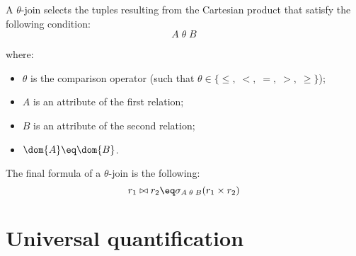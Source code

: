 A $\theta$-join selects the tuples resulting from the Cartesian product that satisfy the following condition:
\[ A \; \theta \; B\]

where:
\begin{itemize}
    \item $\theta$ is the comparison operator (such that $\theta \in \{ \leq, \; <, \; =, \; >, \; \geq \}$);
    \item $A$ is an attribute of the first relation;
    \item $B$ is an attribute of the second relation;
    \item $\dom{A} \eq \dom{B}$.
\end{itemize}

The final formula of a $\theta$-join is the following:
\[ r_1 \bowtie r_2 \eq \sigma_{A \; \theta \; B} (r_1 \times r_2) \]

\section{Universal quantification}

